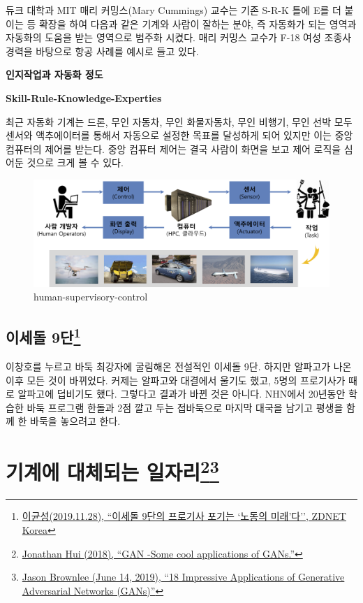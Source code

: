 \documentclass[smallextended]{svjour3}       %
\begin{document}
듀크 대학과 MIT 매리 커밍스(Mary Cummings) 교수는 기존 S-R-K 틀에 E를 더
붙이는 등 확장을 하여 다음과 같은 기계와 사람이 잘하는 분야, 즉 자동화가
되는 영역과 자동화의 도움을 받는 영역으로 범주화 시켰다. 매리 커밍스
교수가 F-18 여성 조종사 경력을 바탕으로 항공 사례를 예시로 들고 있다.

\textbf{인지작업과 자동화 정도}

\textbf{Skill-Rule-Knowledge-Experties}

최근 자동화 기계는 드론, 무인 자동차, 무인 화물자동차, 무인 비행기, 무인
선박 모두 센서와 액추에이터를 통해서 자동으로 설정한 목표를 달성하게
되어 있지만 이는 중앙 컴퓨터의 제어를 받는다. 중앙 컴퓨터 제어는 결국
사람이 화면을 보고 제어 로직을 심어둔 것으로 크게 볼 수 있다.

\begin{figure}
\hypertarget{id}{%
\centering
\includegraphics[width=1\textwidth,height=\textheight]{fig/human-supervisory-control.png}
\caption{human-supervisory-control}\label{id}
}
\end{figure}

\hypertarget{play-go}{%
\subsection[이세돌 9단]{\texorpdfstring{이세돌
9단\footnote{\href{https://n.news.naver.com/article/092/0002175655}{이균성(2019.11.28),
  ``이세돌 9단의 프로기사 포기는 `노동의 미래'다'', ZDNET Korea}}}{이세돌 9단}}\label{play-go}}

이창호를 누르고 바둑 최강자에 굴림해온 전설적인 이세돌 9단. 하지만
알파고가 나온 이후 모든 것이 바뀌었다. 커제는 알파고와 대결에서 울기도
했고, 5명의 프로기사가 때로 알파고에 덥비기도 했다. 그렇다고 결과가 바뀐
것은 아니다. NHN에서 20년동안 학습한 바둑 프로그램 한돌과 2점 깔고 두는
접바둑으로 마지막 대국을 남기고 평생을 함께 한 바둑을 놓으려고 한다.

\hypertarget{challenge-to-human}{%
\section[기계에 대체되는 일자리]{\texorpdfstring{기계에 대체되는
일자리\footnote{\href{https://medium.com/@jonathan_hui/gan-some-cool-applications-of-gans-4c9ecca35900}{Jonathan
  Hui (2018), ``GAN -Some cool applications of GANs.''}}\footnote{\href{https://machinelearningmastery.com/impressive-applications-of-generative-adversarial-networks/}{Jason
  Brownlee (June 14, 2019), ``18 Impressive Applications of Generative
  Adversarial Networks (GANs)''}}}{기계에 대체되는 일자리}}\label{challenge-to-human}}
\end{document}
